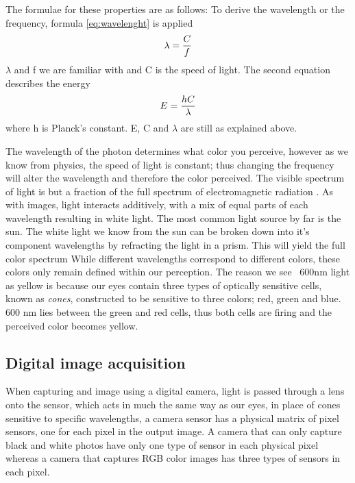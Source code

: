 The formulae for these properties are as follows:
To derive the wavelength or the frequency, formula \ref{eq:wavelenght} is applied
\begin{align}
\centering 
\lambda = \frac{C}{f}
\label{eq:wavelenght} 
\end{align}
$\lambda$ and f we are familiar with and C is the speed of light. The second equation describes the energy 
\begin{align}
\centering
E = \frac{hC}{\lambda}
\label{eq:e_v} 
\end{align}
where h is Planck's constant. E, C and $\lambda$ are still as explained above.

The wavelength of the photon determines what color you perceive, however as we know from physics, the speed of light is constant; thus changing the frequency will alter the wavelength and therefore the color perceived. The visible spectrum of light is but a fraction of the full spectrum of electromagnetic radiation . As with images, light interacts additively, with a mix of equal parts of each wavelength resulting in white light.
The most common light source by far is the sun. The white light we know from the sun can be broken down into it's component wavelengths by refracting the light in a prism. This will yield the full color spectrum
While different wavelengths correspond to different colors, these colors only remain defined within our perception. The reason we see ~600nm light as yellow is because our eyes contain three types of optically sensitive cells, known as \textit{cones}, constructed to be sensitive to three colors; red, green and blue. 600 nm lies between the green and red cells, thus both cells are firing and the perceived color becomes yellow.
\subsection{Digital image acquisition}
When capturing and image using a digital camera, light is passed through a lens onto the sensor, which acts in much the same way as our eyes, in place of cones sensitive to specific wavelengths, a camera sensor has a physical matrix of pixel sensors, one for each pixel in the output image. A camera that can only capture black and white photos have only one type of sensor in each physical pixel whereas a camera that captures RGB color images has three types of sensors in each pixel. 
